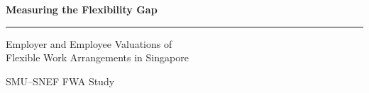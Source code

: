 \documentclass[aspectratio=169,11pt]{beamer}
\newcommand{\StudyName}{SMU--SNEF FWA Study}
\begin{document}

\begin{frame}

\vspace*{1.35cm}

{\color{Navy}\fontsize{28}{33}\selectfont\bfseries
Measuring the Flexibility Gap\par}

\vspace{0.30cm}

{\color{Employer}\rule{1.6cm}{2pt}\par}

\vspace{0.30cm}

{\color{Ink}\fontsize{14}{18}\selectfont
Employer and Employee Valuations of\\
Flexible Work Arrangements in Singapore\par}

\vfill

{\color{Muted}\fontsize{12}{15}\selectfont
\StudyName\par}

\vspace{0.12cm}

{\color{Muted}\fontsize{10.5}{14}\selectfont
\par}

\vspace{0.45cm}

\end{frame}

\end{document}
